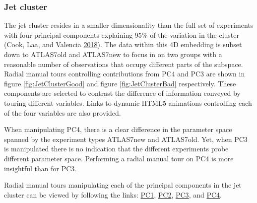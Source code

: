 \hypertarget{jet-cluster}{%
\subsubsection{Jet cluster}\label{jet-cluster}}

The jet cluster resides in a smaller dimensionality than the full set of
experiments with four principal components explaining 95\% of the
variation in the cluster (Cook, Laa, and Valencia
\protect\hyperlink{ref-cook_dynamical_2018}{2018}). The data within this
4D embedding is subset down to ATLAS7old and ATLAS7new to focus in on
two groups with a reasonable number of observations that occupy
different parts of the subspace. Radial manual tours controlling
contributions from PC4 and PC3 are shown in figure
\ref{fig:JetClusterGood} and figure \ref{fig:JetClusterBad}
respectively. These components are selected to contrast the difference
of information conveyed by touring different variables. Links to dynamic
HTML5 animations controlling each of the four variables are also
provided.

When manipulating PC4, there is a clear difference in the parameter
space spanned by the experiment types ATLAS7new and ATLAS7old. Yet, when
PC3 is manipulated there is no indication that the different experiments
probe different parameter space. Performing a radial manual tour on PC4
is more insightful than for PC3.

Radial manual tours manipulating each of the principal components in the
jet cluster can be viewed by following the links:
\href{https://nspyrison.netlify.com/thesis/jetcluster_manualtour_pc1/}{PC1},
\href{https://nspyrison.netlify.com/thesis/jetcluster_manualtour_pc2/}{PC2},
\href{https://nspyrison.netlify.com/thesis/jetcluster_manualtour_pc3/}{PC3},
and
\href{https://nspyrison.netlify.com/thesis/jetcluster_manualtour_pc4/}{PC4}.

